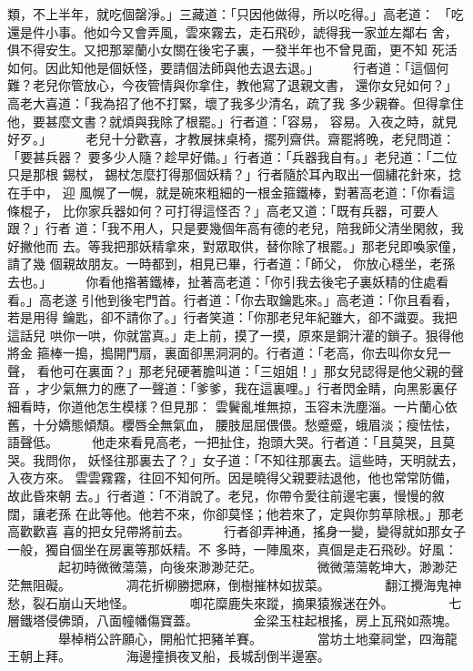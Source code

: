 \begin{pinyinscope}
{類，不上半年，就吃個罄淨。」三藏道：「只因他做得，所以吃得。」高老道：
「吃還是件小事。他如今又會弄風，雲來霧去，走石飛砂，諕得我一家並左鄰右
舍，俱不得安生。又把那翠蘭小女關在後宅子裏，一發半年也不曾見面，更不知
死活如何。因此知他是個妖怪，要請個法師與他去退去退。」
　　
行者道：「這個何難？老兒你管放心，今夜管情與你拿住，教他寫了退親文書，
還你女兒如何？」高老大喜道：「我為招了他不打緊，壞了我多少清名，疏了我
多少親眷。但得拿住他，要甚麼文書？就煩與我除了根罷。」行者道：「容易，
容易。入夜之時，就見好歹。」
　　
老兒十分歡喜，才教展抹桌椅，擺列齋供。齋罷將晚，老兒問道：「要甚兵器？
要多少人隨？趁早好備。」行者道：「兵器我自有。」老兒道：「二位只是那根
錫杖， 錫杖怎麼打得那個妖精？」行者隨於耳內取出一個繡花針來，捻在手中，
迎 風幌了一幌，就是碗來粗細的一根金箍鐵棒，對著高老道：「你看這條棍子，
比你家兵器如何？可打得這怪否？」高老又道：「既有兵器，可要人跟？」行者
道：「我不用人，只是要幾個年高有德的老兒，陪我師父清坐閑敘，我好撇他而
去。等我把那妖精拿來，對眾取供，替你除了根罷。」那老兒即喚家僮，請了幾
個親故朋友。一時都到，相見已畢，行者道：「師父， 你放心穩坐，老孫去也。」
　　
你看他揝著鐵棒，扯著高老道：「你引我去後宅子裏妖精的住處看看。」高老遂
引他到後宅門首。行者道：「你去取鑰匙來。」高老道：「你且看看，若是用得
鑰匙，卻不請你了。」行者笑道：「你那老兒年紀雖大，卻不識耍。我把這話兒
哄你一哄，你就當真。」走上前，摸了一摸，原來是銅汁灌的鎖子。狠得他將金
箍棒一搗，搗開門扇，裏面卻黑洞洞的。行者道：「老高，你去叫你女兒一聲，
看他可在裏面？」那老兒硬著膽叫道：「三姐姐！」那女兒認得是他父親的聲音
，才少氣無力的應了一聲道：「爹爹，我在這裏哩。」行者閃金睛，向黑影裏仔
細看時，你道他怎生模樣？但見那：
雲鬢亂堆無掠，玉容未洗塵淄。一片蘭心依舊，十分嬌態傾頹。櫻唇全無氣血，
腰肢屈屈偎偎。愁蹙蹙，蛾眉淡；瘦怯怯，語聲低。
　　
他走來看見高老，一把扯住，抱頭大哭。行者道：「且莫哭，且莫哭。我問你，
妖怪往那裏去了？」女子道：「不知往那裏去。這些時，天明就去，入夜方來。
雲雲霧霧，往回不知何所。因是曉得父親要祛退他，他也常常防備，故此昏來朝
去。」行者道：「不消說了。老兒，你帶令愛往前邊宅裏，慢慢的敘闊，讓老孫
在此等他。他若不來，你卻莫怪；他若來了，定與你剪草除根。」那老高歡歡喜
喜的把女兒帶將前去。
　　
行者卻弄神通，搖身一變，變得就如那女子一般，獨自個坐在房裏等那妖精。不
多時，一陣風來，真個是走石飛砂。好風：
　　　　起初時微微蕩蕩，向後來渺渺茫茫。
　　　　微微蕩蕩乾坤大，渺渺茫茫無阻礙。
　　　　凋花折柳勝揌麻，倒樹摧林如拔菜。
　　　　翻江攪海鬼神愁，裂石崩山天地怪。
　　　　啣花糜鹿失來蹤，摘果猿猴迷在外。
　　　　七層鐵塔侵佛頭，八面幢幡傷寶蓋。
　　　　金梁玉柱起根搖，房上瓦飛如燕塊。
　　　　舉棹梢公許願心，開船忙把豬羊賽。
　　　　當坊土地棄祠堂，四海龍王朝上拜。
　　　　海邊撞損夜叉船，長城刮倒半邊塞。

}
\end{pinyinscope}
